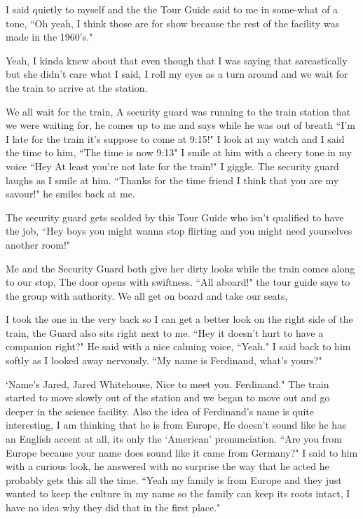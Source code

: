 \documentclass[14pt,letterpaper]{book}
\begin{document}
I said quietly to myself and the the Tour Guide said to me in some-what of a tone, ``Oh yeah, I think those are for show because the rest of the facility was made in the 1960's."

Yeah, I kinda knew about that even though that I was saying that sarcastically but she didn't care what I said, I roll my eyes as a turn around and we wait for the train to arrive at the station.

We all wait for the train, A security guard was running to the train station that we were waiting for, he comes up to me and says while he was out of breath ``I'm I late for the train it's suppose to come at 9:15!" I look at my watch and I said the time to him, ``The time is now 9:13" I smile at him with a cheery tone in my voice ``Hey At least you're not late for the train!" I giggle. The security guard laughs as I smile at him. ``Thanks for the time friend I think that you are my savour!" he smiles back at me.

The security guard gets scolded by this Tour Guide who isn't qualified to have the job, ``Hey boys you might wanna stop flirting and you might need yourselves another room!"

Me and the Security Guard both give her dirty looks while the train comes along to our stop, The door opens with swiftness.
``All aboard!" the tour guide says to the group with authority. We all get on board and take our seats,

I took the one in the very back so I can get a better look on the right side of the train, the Guard also sits right next to me. ``Hey it doesn't hurt to have a companion right?" He said with a nice calming voice, ``Yeah." I said back to him softly as I looked away nervously. ``My name is Ferdinand, what's yours?"

`Name's Jared, Jared Whitehouse, Nice to meet you. Ferdinand." The train started to move slowly out of the station and we began to move out and go deeper in the science facility. Also the idea of Ferdinand's name is quite interesting, I am thinking that he is from Europe, He doesn't sound like he has an English accent at all, its only the `American' pronunciation. ``Are you from Europe because your name does sound like it came from Germany?" I said to him with a curious look, he answered with no surprise the way that he acted he probably gets this all the time. ``Yeah my family is from Europe and they just wanted to keep the culture in my name so the family can keep its roots intact, I have no idea why they did that in the first place."
\end{document}

